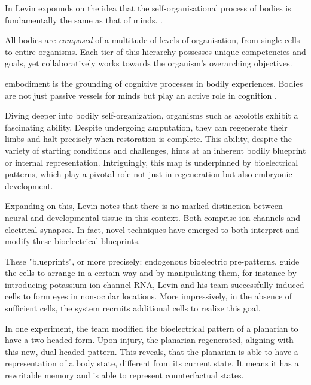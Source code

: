 In  Levin expounds on the idea that the self-organisational process of bodies is fundamentally the same as that of minds. 
. 

All bodies are \emph{composed} of a multitude of levels of organisation, from single cells to entire organisms. Each tier of this hierarchy possesses unique competencies and goals, yet collaboratively works towards the organism's overarching objectives.

\Gls{embodiment} is the grounding of cognitive processes in bodily experiences. Bodies are not just passive vessels for minds but play an active role in cognition . 

Diving deeper into bodily self-organization, organisms such as axolotls exhibit a fascinating ability. Despite undergoing amputation, they can regenerate their limbs and halt precisely when restoration is complete. This ability, despite the variety of starting conditions and challenges, hints at an inherent bodily blueprint or internal representation. Intriguingly, this map is underpinned by bioelectrical patterns, which play a pivotal role not just in regeneration but also embryonic development.

Expanding on this, Levin notes that there is no marked distinction between neural and developmental tissue in this context. Both comprise ion channels and electrical synapses. In fact, novel techniques have emerged to both interpret and modify these bioelectrical blueprints. 

These "blueprints", or more precisely: endogenous bioelectric pre-patterns, guide the cells to arrange in a certain way and by manipulating them, for instance by introducing potassium ion channel RNA, Levin and his team successfully induced cells to form eyes in non-ocular locations. More impressively, in the absence of sufficient cells, the system recruits additional cells to realize this goal.

In one experiment, the team modified the bioelectrical pattern of a planarian to have a two-headed form. Upon injury, the planarian regenerated, aligning with this new, dual-headed pattern. This reveals, that the planarian is able to have a representation of a body state, different from its current state. It means it has a rewritable memory and is able to represent counterfactual states.

